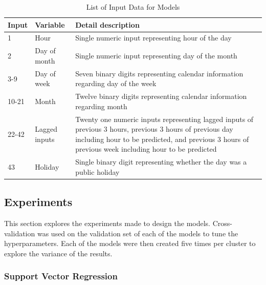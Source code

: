 \begin{table}
	\label{appendix:feature}
	\begin{tabular}{p{1cm}p{3cm}p{8cm}}
		\toprule
		Input & Variable      & Detail description \\
		\midrule
		1     & Hour          & Single numeric input representing hour of the day                                                                                              \\
		2     & Day of month  & Single numeric input representing day of the month                                                                                             \\
		3-9   & Day of week   & Seven binary digits representing calendar information regarding day of the week                                                                                            \\
		10-21 & Month         & Twelve binary digits representing calendar information regarding month                                                                                         \\
		22-42 & Lagged inputs & Twenty one numeric inputs representing lagged inputs of previous 3 hours, previous 3 hours of previous day including hour to be predicted, and previous 3 hours of previous week including hour to be predicted \\
		43    & Holiday       & Single binary digit representing whether the day was a public holiday  \\     \bottomrule                                                           
	\end{tabular}
	\caption{List of Input Data for Models}
\end{table}

\subsection{Experiments}

This section explores the experiments made to design the models. Cross-validation was used on the validation set of each of the models to tune the hyperparameters. Each of the models were then created five times per cluster to explore the variance of the results.

\subsubsection{Support Vector Regression}

